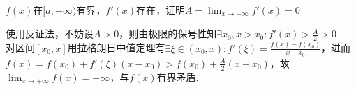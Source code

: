 \begin{example}
$f(x)$在$[a,+\infty)$有界，$f'(x)$存在，证明$A=\displaystyle\lim_{x\to+\infty}f'(x)=0$
\end{example}
\begin{analysis}
使用反证法，不妨设$A>0$，则由极限的保号性知$\displaystyle\exists x_0,x>x_0:f'(x)>\frac{A}{2}>0$\\
对区间$[x_0,x]$用拉格朗日中值定理有$\exists\xi\in(x_0,x):\displaystyle f'(\xi)=\frac{f(x)-f(x_0)}{x-x_0}$，进而$\displaystyle f(x)=f(x_0)+f'(\xi)(x-x_0)>f(x_0)+\frac{A}{2}(x-x_0)$，故$\displaystyle\lim_{x\to+\infty}f(x)=+\infty$，与$f(x)$有界矛盾.
\end{analysis}